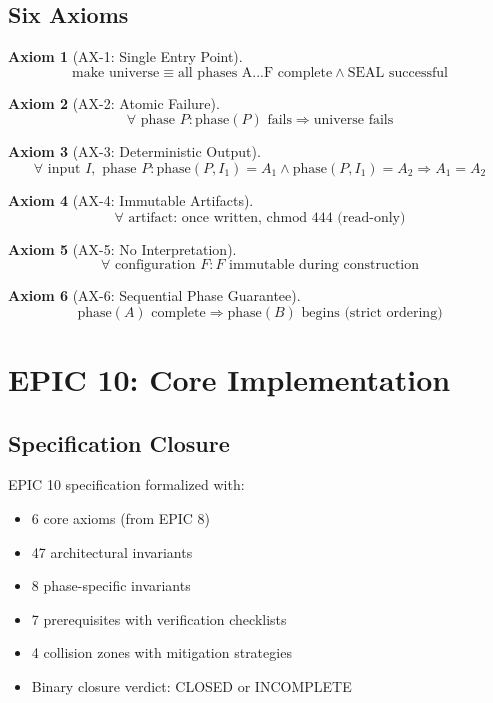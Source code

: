 \documentclass[12pt,oneside,a4paper]{book}
\theoremstyle{definition}
\newtheorem{axiom}{Axiom}[chapter]
\begin{document}
\section{Six Axioms}
\label{sec:epic8-axioms}

\begin{axiom}[AX-1: Single Entry Point]
$$\text{make universe} \equiv \text{all phases A...F complete} \land \text{SEAL successful}$$
\end{axiom}

\begin{axiom}[AX-2: Atomic Failure]
$$\forall \text{ phase } P: \text{phase}(P) \text{ fails} \Rightarrow \text{universe fails}$$
\end{axiom}

\begin{axiom}[AX-3: Deterministic Output]
$$\forall \text{ input } I, \text{ phase } P: \text{phase}(P, I_1) = A_1 \land \text{phase}(P, I_1) = A_2 \Rightarrow A_1 = A_2$$
\end{axiom}

\begin{axiom}[AX-4: Immutable Artifacts]
$$\forall \text{ artifact: once written, } \text{chmod 444 (read-only)}$$
\end{axiom}

\begin{axiom}[AX-5: No Interpretation]
$$\forall \text{ configuration } F: F \text{ immutable during construction}$$
\end{axiom}

\begin{axiom}[AX-6: Sequential Phase Guarantee]
$$\text{phase}(A) \text{ complete} \Rightarrow \text{phase}(B) \text{ begins (strict ordering)}$$
\end{axiom}

\chapter{EPIC 10: Core Implementation}
\label{ch:epic10}


\section{Specification Closure}
\label{sec:epic10-closure}

EPIC 10 specification formalized with:
\begin{itemize}
  \item 6 core axioms (from EPIC 8)
  \item 47 architectural invariants
  \item 8 phase-specific invariants
  \item 7 prerequisites with verification checklists
  \item 4 collision zones with mitigation strategies
  \item Binary closure verdict: CLOSED or INCOMPLETE
\end{itemize}
\end{document}
